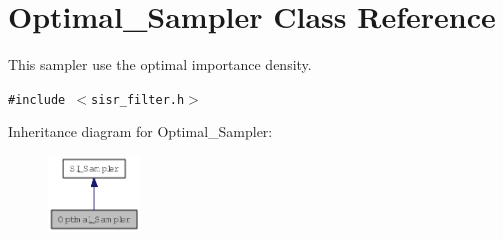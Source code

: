 \hypertarget{class_optimal___sampler}{
\section{Optimal\_\-Sampler Class Reference}
\label{class_optimal___sampler}
}
This sampler use the optimal importance density.  


{\tt \#include $<$sisr\_\-filter.h$>$}

Inheritance diagram for Optimal\_\-Sampler:\nopagebreak
\begin{figure}[H]
\begin{center}
\leavevmode
\includegraphics[width=69pt]{class_optimal___sampler__inherit__graph}
\end{center}
\end{figure}
